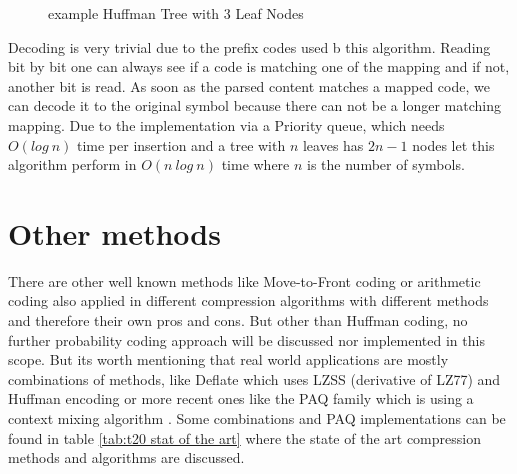 {\begin{figure}[h]
	\centering
{}
	\caption{example Huffman Tree with 3 Leaf Nodes} \label{fig:M1:example Huffman tree}
\end{figure}
}
\par{
Decoding is very trivial due to the prefix codes used b this algorithm. Reading bit by bit one can always see if a code is matching one of the mapping and if not, another bit is read. As soon as the parsed content matches a mapped code, we can decode it to the original symbol because there can not be a longer matching mapping. Due to the implementation via a Priority queue, which needs $O(log \: n)$ time per insertion and a tree with $n$ leaves has $2n-1$ nodes let this algorithm perform in $O(n \: log \: n)$ time where $n$ is the number of symbols.
}

\section{Other methods}
\label{ch:Principles of compression:sec:Other}
\par{
There are other well known methods like Move-to-Front coding or arithmetic coding also applied in different compression algorithms with different methods and therefore their own pros and cons. But other than Huffman coding, no further probability coding approach will be discussed nor implemented in this scope. But its worth mentioning that real world applications are mostly combinations of methods, like Deflate\cite{deutsch1996rfc1951} which uses LZSS\cite{10.1145/322344.322346} (derivative of LZ77) and Huffman encoding or more recent ones like the PAQ family which is using a context mixing algorithm \cite{mahoney2009data}. Some combinations and PAQ implementations can be found in table \ref{tab:t20 stat of the art} where the state of the art compression methods and algorithms are discussed.
}

